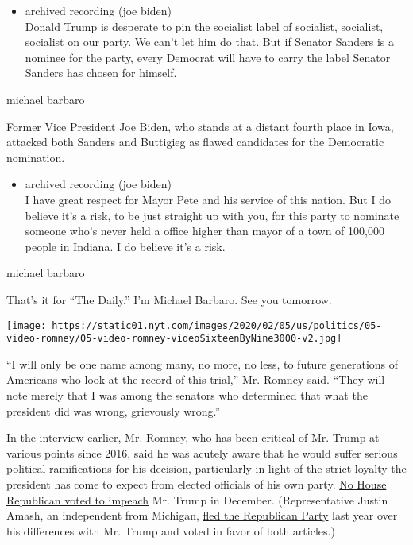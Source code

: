 \begin{itemize}
\tightlist
\item
  archived recording (joe biden)\\
  Donald Trump is desperate to pin the socialist label of socialist,
  socialist, socialist on our party. We can't let him do that. But if
  Senator Sanders is a nominee for the party, every Democrat will have
  to carry the label Senator Sanders has chosen for himself.
\end{itemize}

michael barbaro

Former Vice President Joe Biden, who stands at a distant fourth place in
Iowa, attacked both Sanders and Buttigieg as flawed candidates for the
Democratic nomination.

\begin{itemize}
\tightlist
\item
  archived recording (joe biden)\\
  I have great respect for Mayor Pete and his service of this nation.
  But I do believe it's a risk, to be just straight up with you, for
  this party to nominate someone who's never held a office higher than
  mayor of a town of 100,000 people in Indiana. I do believe it's a
  risk.
\end{itemize}

michael barbaro

That's it for ``The Daily.'' I'm Michael Barbaro. See you tomorrow.

\texttt{[image: https://static01.nyt.com/images/2020/02/05/us/politics/05-video-romney/05-video-romney-videoSixteenByNine3000-v2.jpg]}

``I will only be one name among many, no more, no less, to future
generations of Americans who look at the record of this trial,'' Mr.
Romney said. ``They will note merely that I was among the senators who
determined that what the president did was wrong, grievously wrong.''

In the interview earlier, Mr. Romney, who has been critical of Mr. Trump
at various points since 2016, said he was acutely aware that he would
suffer serious political ramifications for his decision, particularly in
light of the strict loyalty the president has come to expect from
elected officials of his own party.
\href{https://www.nytimes.com/interactive/2019/12/18/us/politics/trump-impeachment-vote.html}{No
House Republican voted to impeach} Mr. Trump in December.
(Representative Justin Amash, an independent from Michigan,
\href{https://www.nytimes.com/2019/07/04/us/politics/justin-amash-trump.html}{fled
the Republican Party} last year over his differences with Mr. Trump and
voted in favor of both articles.)

